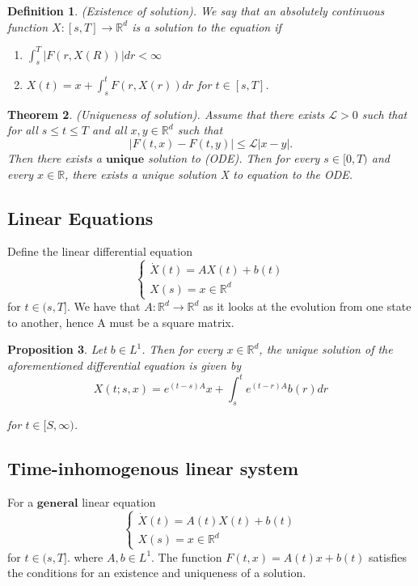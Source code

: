 \documentclass[twoside]{article}
\newcounter{lecnum}
\newtheorem{theorem}{Theorem}[lecnum]
\newtheorem{proposition}[theorem]{Proposition}
\newtheorem{definition}[theorem]{Definition}
\begin{document}
\begin{definition}(Existence of solution). We say that an absolutely continuous function $X: [s,T] \rightarrow \mathbb{R}^d$ is a solution to the equation if 
\begin{enumerate}
\item $\int_s^T|F(r,X(R))|dr < \infty$ 
\item $X(t) = x + \int_s^tF(r,X(r))dr$ for $t \in [s,T]$.
\end{enumerate}
\end{definition}

\begin{theorem}(Uniqueness of solution). Assume that there exists $\mathcal{L} > 0$ such that for all $s \leq t \leq T$ and all $x,y \in \mathbb{R}^d$ such that
$$
|F(t,x) - F(t,y)| \leq \mathcal{L}|x-y|.
$$
Then there exists a $\textbf{unique}$ solution to (ODE). Then for every $s \in [0,T)$ and every $x \in \mathbb{R}$, there exists a unique solution X to equation to the ODE.
\end{theorem}
\subsection{Linear Equations}

Define the linear differential equation
$$ \begin{cases}\dot{X}(t)=AX(t) + b(t) \\ 
X(s) = x \in \mathbb{R}^d \end{cases}$$ for $t \in (s,T]$. We have that $A: \mathbb{R}^d \rightarrow \mathbb{R}^d$ as it looks at the evolution from one state to another, hence A must be a square matrix. 

\begin{proposition}
Let $b \in L^1$. Then for every $x \in \mathbb{R}^d$, the unique solution of the aforementioned differential equation is given by
$$
X(t;s,x) = e^{(t-s)A}x + \int_s^te^{(t-r)A}b(r)dr
$$

for $t \in [S,\infty)$.
\end{proposition}

\subsection{Time-inhomogenous linear system}
For a $\textbf{general}$ linear equation
$$\begin{cases} \dot{X}(t)=A(t)X(t) + b(t) \\ 
X(s) = x \in \mathbb{R}^d \end{cases}$$ for $t \in (s,T]$.
where $A, b \in L^1$. 
\newline
The function $F(t,x) = A(t)x + b(t)$ satisfies the conditions for an existence and uniqueness of a solution.
\end{document}
